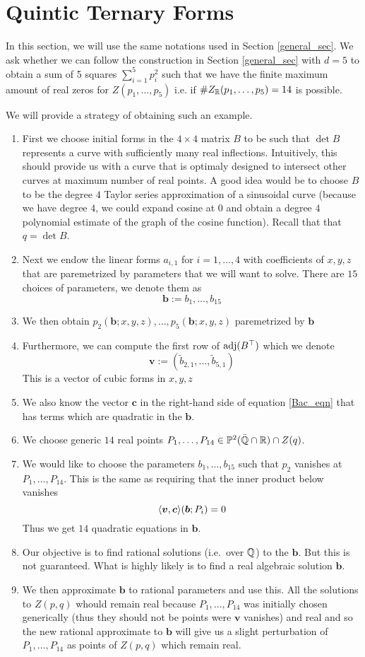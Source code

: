 \section{Quintic Ternary Forms}

In this section, we will use the same notations used in Section \ref{general_sec}.
We ask whether we can follow the construction in Section \ref{general_sec} with $d=5$ to obtain a sum of 5 squares 
$\sum_{i=1}^5 p_i^2$ such that we have the finite maximum amount of real zeros for $Z(p_1,\dots, p_5)$ i.e. 
if $\# Z_{\mathbb{R}}(p_1,\dots, p_5) = 14$ is possible.

We will provide a strategy of obtaining such an example. 

\begin{enumerate}
\item First we choose initial forms in the $4\times 4$ matrix $B$ to be such that $\det B$ represents a curve with 
sufficiently many real inflections. Intuitively, this should provide us with a curve that is optimaly designed to 
intersect other curves at maximum number of real points. A good idea would be to choose $B$ to be the degree $4$ Taylor 
series approximation of a sinusoidal curve (because we have degree $4$, we could expand cosine at $0$ and obtain a 
degree $4$ polynomial estimate of the graph of the cosine function). Recall that that $q=\det B$.
\item Next we endow the linear forms $a_{i,1}$ for $i=1,\dots, 4$ with coefficients of $x,y,z$ that are paremetrized 
by parameters that we will want to solve. There are $15$ choices of parameters, we denote them as 
$$\bm b := b_1,\dots, b_{15}$$
\item We then obtain $p_2(\bm b;x,y,z),\dots, p_5(\bm b;x,y,z)$ paremetrized by $\bm b$
\item Furthermore, we can compute the first row of $\operatorname{adj}(B^\top)$ which we denote
$$\bm v := (\tilde b_{2,1},\dots, \tilde b_{5,1})$$
This is a vector of cubic forms in $x,y,z$
\item We also know the vector $\bm c$ in the right-hand side of equation \eqref{Bac_eqn} that has terms which are
quadratic in the $\bm b$.
\item We choose generic $14$ real points $P_1,\dots, P_{14} \in \mathbb{P}^2(\bar {\mathbb{Q}}\cap\mathbb{R}) \cap Z(q)$.
\item We would like to choose the parameters $b_1,\dots, b_{15}$ such that $p_2$ vanishes at $P_1,\dots, P_{14}$. 
This is the same as requiring that the inner product below vanishes
$$\langle \bm v, \bm c \rangle(\bm b;P_i) = 0$$
Thus we get $14$ quadratic equations in $\bm b$. 
\item Our objective is to find rational solutions (i.e.\ over $\mathbb{Q}$) to the $\bm b$. But this is not guaranteed. What 
is highly likely is to find a real algebraic solution $\bm b$. 
\item We then approximate $\bm b$ to rational parameters and use this. All the solutions to $Z(p,q)$ whould remain real
because $P_1,\dots, P_{14}$ was initially chosen generically (thus they should not be points were $\bm v$ vanishes) 
and real and so the new rational approximate to $\bm b$ will give us a slight perturbation of $P_1,\dots,P_{14}$ as 
points of $Z(p,q)$ which remain real.
\end{enumerate}
